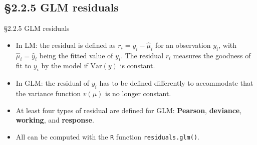 \documentclass{beamer}
\newcommand{\currentsection}{}
\let\oldsection\section
\renewcommand{\section}[1]{\oldsection{#1}\renewcommand{\currentsection}{#1}}
\newcommand{\currentsubsection}{}
\let\oldsubsection\subsection
\renewcommand{\subsection}[1]{\oldsubsection{#1}\renewcommand{\currentsubsection}{#1}}
\newenvironment{wideitemize}%
  {\begin{itemize}%
    \setlength{\parskip}{1em}}%
  {\end{itemize}}
\begin{document}

\subsection{\S2.2.5 GLM residuals}\label{sec:2.2.5}

\begin{frame}{\S2.2.5 GLM residuals}
\begin{wideitemize}
\item
In LM:  
the residual is defined as $r_i=y_i-\hat{\mu}_i$ for an observation $y_i$, with $\hat{\mu}_i=\hat{y}_i$ being the 
fitted value of $y_i$.
The residual $r_i$ measures the goodness of fit to $y_i$ by the model if $\mbox{Var}(y)$ is constant.
\item
In GLM: the residual of $y_i$ has to be defined differently to accommodate that the variance function $v(\mu)$ is no longer constant.
\item
At least four types of residual are defined for GLM: \textbf{Pearson}, \textbf{deviance}, \textbf{working}, and
\textbf{response}. 

\item All  can be computed with the \texttt{R} function \texttt{residuals.glm()}.

\end{wideitemize}
\end{frame}
\end{document}
